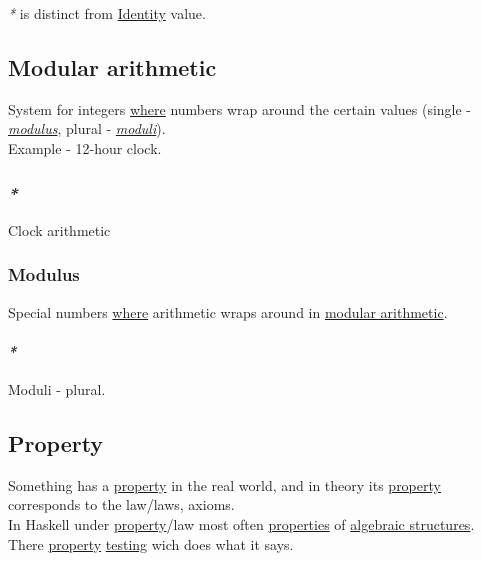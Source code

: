 \documentclass[11pt]{article}
\begin{document}
\emph{*} is distinct from \hyperref[org9b95fd5]{Identity} value.\\

\subsection{\label{orgb03f430}Modular arithmetic}
\label{sec:orgf48ed23}
System for integers \hyperref[org3e5903d]{where} numbers wrap around the certain values (single - \emph{\hyperref[orgfadfa40]{modulus}}, plural - \emph{\hyperref[org9cd173b]{moduli}}).\\

Example - 12-hour clock.\\

\subsubsection{\emph{*}}
\label{sec:org9e42d62}

\label{org8d0aa10}Clock arithmetic\\

\subsubsection{\label{orgfadfa40}Modulus}
\label{sec:orgcde30e1}
Special numbers \hyperref[org3e5903d]{where} arithmetic wraps around in \hyperref[orgb03f430]{modular arithmetic}.\\

\paragraph{\emph{*}}
\label{sec:org11bcb74}

\label{org9cd173b}Moduli - plural.\\

\subsection{\label{orgf8c3cc7}Property}
\label{sec:org4773539}
Something has a \hyperref[orgf8c3cc7]{property} in the real world, and in theory its \hyperref[orgf8c3cc7]{property} corresponds to the law/laws, axioms.\\

In Haskell under \hyperref[orgf8c3cc7]{property}/law most often \hyperref[org85fb3a1]{properties} of \hyperref[org0b3e581]{algebraic structures}.\\

There \hyperref[orgf8c3cc7]{property} \hyperref[org8d1ff3f]{testing} wich does what it says.\\
\end{document}
